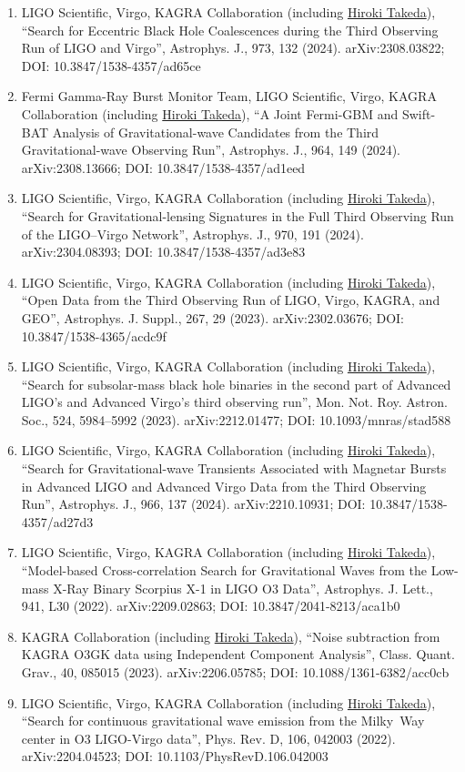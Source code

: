 \documentclass[uplatex, 12pt]{article}
\begin{document}
\begin{enumerate}
\item LIGO Scientific, Virgo, KAGRA Collaboration (including \uline{Hiroki Takeda}), “Search for Eccentric Black Hole Coalescences during the Third Observing Run of LIGO and Virgo”, Astrophys. J., 973, 132 (2024). arXiv:2308.03822; DOI: 10.3847/1538-4357/ad65ce
\item Fermi Gamma-Ray Burst Monitor Team, LIGO Scientific, Virgo, KAGRA Collaboration (including \uline{Hiroki Takeda}), “A Joint Fermi-GBM and Swift-BAT Analysis of Gravitational-wave Candidates from the Third Gravitational-wave Observing Run”, Astrophys. J., 964, 149 (2024). arXiv:2308.13666; DOI: 10.3847/1538-4357/ad1eed
\item LIGO Scientific, Virgo, KAGRA Collaboration (including \uline{Hiroki Takeda}), “Search for Gravitational-lensing Signatures in the Full Third Observing Run of the LIGO–Virgo Network”, Astrophys. J., 970, 191 (2024). arXiv:2304.08393; DOI: 10.3847/1538-4357/ad3e83
\item LIGO Scientific, Virgo, KAGRA Collaboration (including \uline{Hiroki Takeda}), “Open Data from the Third Observing Run of LIGO, Virgo, KAGRA, and GEO”, Astrophys. J. Suppl., 267, 29 (2023). arXiv:2302.03676; DOI: 10.3847/1538-4365/acdc9f
\item LIGO Scientific, Virgo, KAGRA Collaboration (including \uline{Hiroki Takeda}), “Search for subsolar-mass black hole binaries in the second part of Advanced LIGO's and Advanced Virgo's third observing run”, Mon. Not. Roy. Astron. Soc., 524, 5984--5992 (2023). arXiv:2212.01477; DOI: 10.1093/mnras/stad588
\item LIGO Scientific, Virgo, KAGRA Collaboration (including \uline{Hiroki Takeda}), “Search for Gravitational-wave Transients Associated with Magnetar Bursts in Advanced LIGO and Advanced Virgo Data from the Third Observing Run”, Astrophys. J., 966, 137 (2024). arXiv:2210.10931; DOI: 10.3847/1538-4357/ad27d3
\item LIGO Scientific, Virgo, KAGRA Collaboration (including \uline{Hiroki Takeda}), “Model-based Cross-correlation Search for Gravitational Waves from the Low-mass X-Ray Binary Scorpius X-1 in LIGO O3 Data”, Astrophys. J. Lett., 941, L30 (2022). arXiv:2209.02863; DOI: 10.3847/2041-8213/aca1b0
\item KAGRA Collaboration (including \uline{Hiroki Takeda}), “Noise subtraction from KAGRA O3GK data using Independent Component Analysis”, Class. Quant. Grav., 40, 085015 (2023). arXiv:2206.05785; DOI: 10.1088/1361-6382/acc0cb
\item LIGO Scientific, Virgo, KAGRA Collaboration (including \uline{Hiroki Takeda}), “Search for continuous gravitational wave emission from the Milky~Way center in O3 LIGO-Virgo data”, Phys. Rev. D, 106, 042003 (2022). arXiv:2204.04523; DOI: 10.1103/PhysRevD.106.042003

\end{enumerate}
\end{document}
